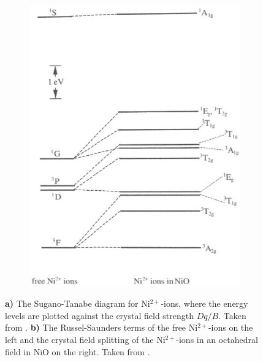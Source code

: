 \begin{figure}[ht]
\begin{subfigure}[b]{0.4\textwidth}
        \includegraphics[width=\textwidth]{pictures/3.png}
        \caption{}
        \label{fig:3}
    \end{subfigure}
    \caption{\textbf{a)} The Sugano-Tanabe diagram for Ni$^{2+}$-ions, where the energy levels are plotted against the crystal field strength $Dq/B$. Taken from \cite{radwanski_nio_2006}. \textbf{b)} The Russel-Saunders terms of the free Ni$^{2+}$-ions on the left and the crystal field splitting of the Ni$^{2+}$-ions in an octahedral field in NiO on the right. Taken from \cite{fromme_b_d-d_2001}.}
\end{figure}
\FloatBarrier

